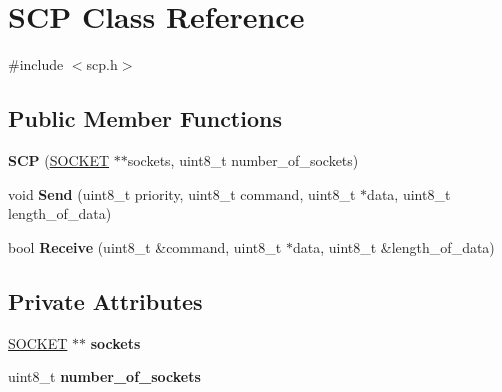 \hypertarget{class_s_c_p}{\section{S\-C\-P Class Reference}
\label{class_s_c_p}
}


{\ttfamily \#include $<$scp.\-h$>$}

\subsection*{Public Member Functions}
\begin{DoxyCompactItemize}
\item 
\hypertarget{class_s_c_p_a9ab03c4d3f03f25c1953b13120ec7b71}{{\bfseries S\-C\-P} (\hyperlink{class_s_o_c_k_e_t}{S\-O\-C\-K\-E\-T} $\ast$$\ast$sockets, uint8\-\_\-t number\-\_\-of\-\_\-sockets)}\label{class_s_c_p_a9ab03c4d3f03f25c1953b13120ec7b71}

\item 
\hypertarget{class_s_c_p_a02460c47705c42c2ade1608007d7966a}{void {\bfseries Send} (uint8\-\_\-t priority, uint8\-\_\-t command, uint8\-\_\-t $\ast$data, uint8\-\_\-t length\-\_\-of\-\_\-data)}\label{class_s_c_p_a02460c47705c42c2ade1608007d7966a}

\item 
\hypertarget{class_s_c_p_ab01a551b8edf803faaea5b0310345498}{bool {\bfseries Receive} (uint8\-\_\-t \&command, uint8\-\_\-t $\ast$data, uint8\-\_\-t \&length\-\_\-of\-\_\-data)}\label{class_s_c_p_ab01a551b8edf803faaea5b0310345498}

\end{DoxyCompactItemize}
\subsection*{Private Attributes}
\begin{DoxyCompactItemize}
\item 
\hypertarget{class_s_c_p_a0b1f95d779a178ee512c260162b5c9d7}{\hyperlink{class_s_o_c_k_e_t}{S\-O\-C\-K\-E\-T} $\ast$$\ast$ {\bfseries sockets}}\label{class_s_c_p_a0b1f95d779a178ee512c260162b5c9d7}

\item 
\hypertarget{class_s_c_p_a60870833801da77a079ebed8383c91bf}{uint8\-\_\-t {\bfseries number\-\_\-of\-\_\-sockets}}\label{class_s_c_p_a60870833801da77a079ebed8383c91bf}

\end{DoxyCompactItemize}


